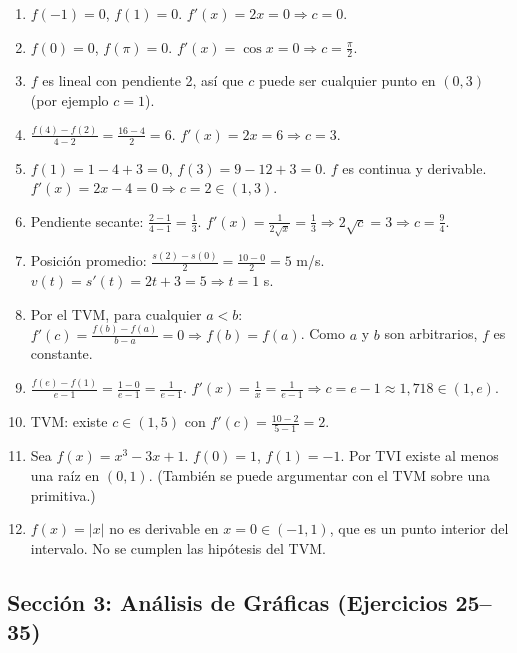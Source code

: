 \documentclass[12pt, letterpaper]{article}
\begin{document}
  \begin{enumerate}[resume=respuestas, leftmargin=*, label=\textbf{\arabic*.}]
    \item $f(-1) = 0$, $f(1) = 0$. $f'(x) = 2x = 0 \Rightarrow c = 0$.
    \item $f(0) = 0$, $f(\pi) = 0$. $f'(x) = \cos x = 0 \Rightarrow c = \frac{\pi}{2}$.
    \item $f$ es lineal con pendiente 2, así que $c$ puede ser cualquier punto en $(0, 3)$ (por ejemplo $c = 1$).
    \item $\frac{f(4) - f(2)}{4 - 2} = \frac{16 - 4}{2} = 6$. $f'(x) = 2x = 6 \Rightarrow c = 3$.
    \item $f(1) = 1 - 4 + 3 = 0$, $f(3) = 9 - 12 + 3 = 0$. $f$ es continua y derivable. $f'(x) = 2x - 4 = 0 \Rightarrow c = 2 \in (1, 3)$.
    \item Pendiente secante: $\frac{2 - 1}{4 - 1} = \frac{1}{3}$. $f'(x) = \frac{1}{2\sqrt{x}} = \frac{1}{3} \Rightarrow 2\sqrt{c} = 3 \Rightarrow c = \frac{9}{4}$.
    \item Posición promedio: $\frac{s(2) - s(0)}{2} = \frac{10 - 0}{2} = 5$ m/s. $v(t) = s'(t) = 2t + 3 = 5 \Rightarrow t = 1$ s.
    \item Por el TVM, para cualquier $a < b$: $f'(c) = \frac{f(b) - f(a)}{b - a} = 0 \Rightarrow f(b) = f(a)$. Como $a$ y $b$ son arbitrarios, $f$ es constante.
    \item $\frac{f(e) - f(1)}{e - 1} = \frac{1 - 0}{e - 1} = \frac{1}{e - 1}$. $f'(x) = \frac{1}{x} = \frac{1}{e - 1} \Rightarrow c = e - 1 \approx 1{,}718 \in (1, e)$.
    \item TVM: existe $c \in (1, 5)$ con $f'(c) = \frac{10 - 2}{5 - 1} = 2$.
    \item Sea $f(x) = x^3 - 3x + 1$. $f(0) = 1$, $f(1) = -1$. Por TVI existe al menos una raíz en $(0,1)$. (También se puede argumentar con el TVM sobre una primitiva.)
    \item $f(x) = |x|$ no es derivable en $x = 0 \in (-1, 1)$, que es un punto interior del intervalo. No se cumplen las hipótesis del TVM.
  \end{enumerate}


  \subsection*{Sección 3: Análisis de Gráficas (Ejercicios 25--35)}
\end{document}
